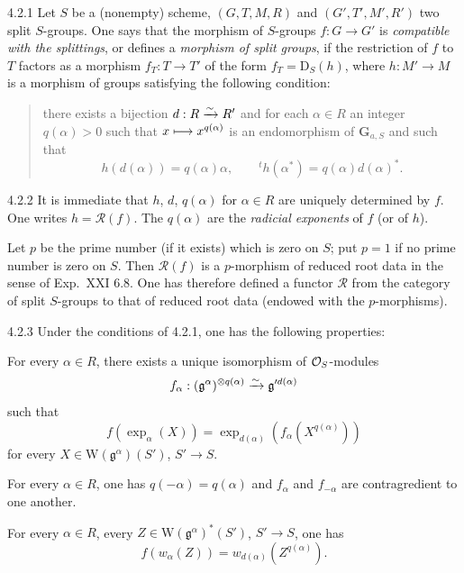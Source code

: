 \begin{definition}{4.2.1}\label{XXII.4.2.1}
Let $S$ be a (nonempty) scheme, $(G,T,M,R)$ and $(G',T',M',R')$ two split $S$-groups. One says that the morphism of $S$-groups $f:G\to G'$ is \emph{compatible with the splittings}, or defines a \emph{morphism of split groups}, if the restriction of $f$ to $T$ factors as a morphism $f_T:T\to T'$ of the form $f_T=\mathrm D_S(h)$, where $h:M'\to M$ is a morphism of groups satisfying the following condition:
\begin{quote}
there exists a bijection $d:R\xrightarrow{\sim} R'${\renewcommand{\thefootnote}{(19)}} and for each $\alpha\in R$ an integer $q(\alpha)>0$ such that $x\longmapsto x^{q(\alpha)}$ is an endomorphism of $\mathbf G_{a,S}$ and such that
\[
h(d(\alpha))=q(\alpha)\alpha,\qquad{}^t h(\alpha^*)=q(\alpha)d(\alpha)^*.
\]
\end{quote}
\end{definition}
\begin{remark}{4.2.2}\label{XXII.4.2.2}
It is immediate that $h$, $d$, $q(\alpha)$ for $\alpha\in R$ are uniquely determined by $f$. One writes $h=\mathscr R(f)$. The $q(\alpha)$ are the \emph{radicial exponents} of $f$ (or of $h$).

Let $p$ be the prime number (if it exists) which is zero on $S$; put $p=1$ if no prime number is zero on $S$. Then $\mathscr R(f)$ is a $p$-morphism of reduced root data in the sense of Exp.~XXI 6.8. One has therefore defined a functor $\mathscr R$ from the category of split $S$-groups to that of reduced root data (endowed with the $p$-morphisms).
\end{remark}
\begin{proposition}{4.2.3}\label{XXII.4.2.3}
Under the conditions of 4.2.1, one has the following properties:
\begin{enumeratei}
\item For every $\alpha\in R$, there exists a unique isomorphism of $\mathcal{O}_S$-modules
\[
f_\alpha:(\mathfrak g^\alpha)^{\otimes q(\alpha)}\xrightarrow{\sim}\mathfrak g'^{d(\alpha)}
\]
such that
\[
f(\exp_\alpha(X))=\exp_{d(\alpha)}(f_\alpha(X^{q(\alpha)}))
\]
for every $X\in\mathrm W(\mathfrak g^\alpha)(S')$, $S'\to S$.
\item For every $\alpha\in R$, one has $q(-\alpha)=q(\alpha)$ and $f_\alpha$ and $f_{-\alpha}$ are contragredient to one another.
\item For every $\alpha\in R$, every $Z\in\mathrm W(\mathfrak g^\alpha)^*(S')$, $S'\to S$, one has
\[
f(w_\alpha(Z))=w_{d(\alpha)}(Z^{q(\alpha)}).
\]
\end{enumeratei}
\end{proposition}
